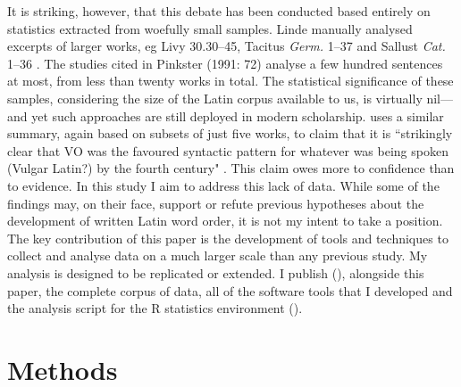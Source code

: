 \documentclass[11pt,a4paper]{scrartcl} %
\begin{document}
It is striking, however, that this debate has been conducted based entirely on statistics extracted from woefully small samples. Linde manually analysed excerpts of larger works, eg Livy 30.30--45, Tacitus \textit{Germ.} 1--37 and Sallust \textit{Cat.} 1--36 \cite[154]{linde}. The studies cited in Pinkster (1991: 72) analyse a few hundred sentences at most, from less than twenty works in total. The statistical significance of these samples, considering the size of the Latin corpus available to us, is virtually nil---and yet such approaches are still deployed in modern scholarship. \cite{blake} uses a similar summary, again based on subsets of just five works, to claim that it is ``strikingly clear that VO was the favoured syntactic pattern for whatever was being spoken (Vulgar Latin?) by the fourth century" \cite[223]{blake}. This claim owes more to confidence than to evidence. In this study I aim to address this lack of data. While some of the findings may, on their face, support or refute previous hypotheses about the development of written Latin word order, it is not my intent to take a position. The key contribution of this paper is the development of tools and techniques to collect and analyse data on a much larger scale than any previous study. My analysis is designed to be replicated or extended. I publish (\cite{ovvo}), alongside this paper, the complete corpus of data, all of the software tools that I developed and the analysis script for the R statistics environment (\cite{r}).

\section{Methods}
\end{document}
